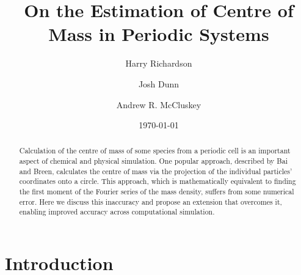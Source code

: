 \documentclass[reprint,superscriptaddress,nobibnotes,amsmath,amssymb,aip]{revtex4-2}
\newcommand{\papertitle}{On the Estimation of Centre of Mass in Periodic Systems}
\begin{document}
\let\oldaddcontentsline\addcontentsline
\renewcommand{\addcontentsline}[3]{}

\title[Accurate Centre of Mass Estimation]{\papertitle}

\author{Harry Richardson}
\author{Josh Dunn}
\author{Andrew R. McCluskey}

\date{\today}

\begin{abstract}
Calculation of the centre of mass of some species from a periodic cell is an important aspect of chemical and physical simulation. 
One popular approach, described by Bai and Breen, calculates the centre of mass via the projection of the individual particles' coordinates onto a circle.
This approach, which is mathematically equivalent to finding the first moment of the Fourier series of the mass density, suffers from some numerical error. 
Here we discuss this inaccuracy and propose an extension that overcomes it, enabling improved accuracy across computational simulation. 
\end{abstract}

\maketitle

\section{Introduction}
\label{sec:intro}
\end{document}
